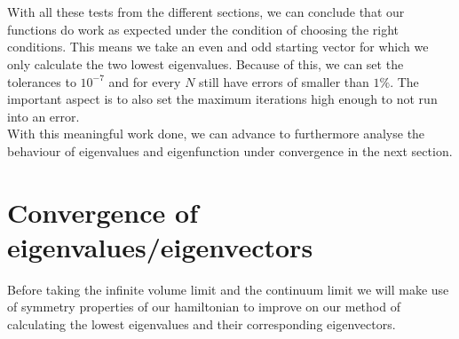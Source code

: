 \documentclass[11pt, letterpaper, onecolumn]{article}
\begin{document}
		\\
		\\
		With all these tests from the different sections, we can conclude that our functions do work as expected under the condition of choosing the right conditions. This means we take an even and odd starting vector for which we only calculate the two lowest eigenvalues. Because of this, we can set the tolerances to $10^{-7}$ and for every $N$ still have errors of smaller than $1\%$. The important aspect is to also set the maximum iterations high enough to not run into an error.\\
		With this meaningful work done, we can advance to furthermore analyse the behaviour of eigenvalues and eigenfunction under convergence in the next section.
	

 	\section{Convergence of eigenvalues/eigenvectors}
	Before taking the infinite volume limit and the continuum limit we will make use of symmetry properties of our hamiltonian to improve on our method of calculating the lowest eigenvalues and their corresponding eigenvectors.
\end{document}
